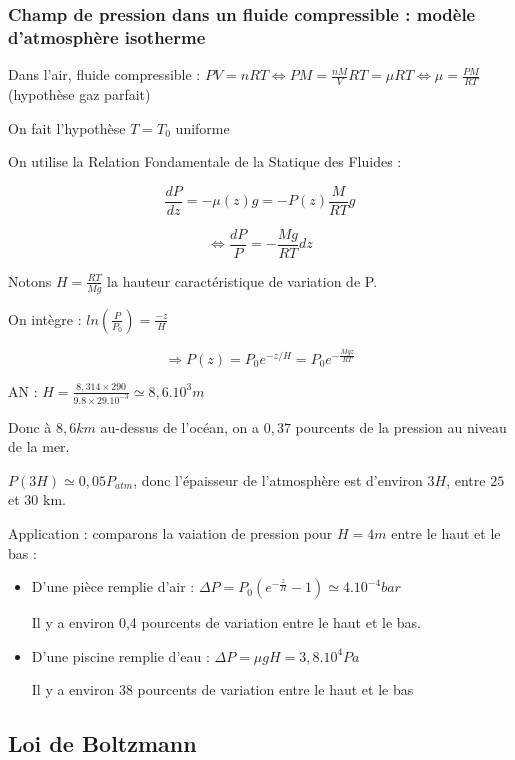 \documentclass[a4paper,12pt]{book}
\begin{document}
\subsubsection{Champ de pression dans un fluide compressible : modèle d'atmosphère isotherme}
Dans l'air, fluide compressible : $PV=nRT \Leftrightarrow PM = \frac{nM}{V}RT=\mu RT \Leftrightarrow \mu =\frac{PM}{RT}$ (hypothèse gaz parfait)
\par On fait l'hypothèse $T=T_0$ uniforme
\par On utilise la Relation Fondamentale de la Statique des Fluides :
\par $$ \frac{dP}{dz} =-\mu(z) g=-P(z)\frac{M}{RT}g$$
\par $$ \Leftrightarrow \frac{dP}{P}=-\frac{Mg}{RT}dz$$
\par Notons $H=\frac{RT}{Mg}$ la hauteur caractéristique de variation de P.
\par On intègre : $ln\left(\frac{P}{P_0}\right)=\frac{-z}{H}$
\par $$\Rightarrow P(z) = P_0e^{-z/H}=P_0e^{-\frac{Mgz}{RT}}$$
\par AN : $H=\frac{8,314\times 290}{9.8\times  29.10^{-3}}\simeq 8,6.10^3m$
\par Donc à $8,6km$ au-dessus de l'océan, on a $0,37$ pourcents de la pression au niveau de la mer.
\par $P(3H) \simeq 0,05 P_{atm}$, donc l'épaisseur de l'atmosphère est d'environ $3H$, entre $25$ et $30$ km.
\par Application : comparons la vaiation de pression pour $H=4m$ entre le haut et le bas :\begin{itemize}
    \item D'une pièce remplie d'air : $\Delta P = P_0(e^{-\frac{z}{H}}-1)\simeq 4.10^{-4} bar$
    \par Il y a environ 0,4 pourcents de variation entre le haut et le bas. 
    \item D'une piscine remplie d'eau : $\Delta P = \mu gH = 3,8.10^4 Pa$
    \par Il y a environ 38 pourcents de variation entre le haut et le bas
\end{itemize}

\subsection{Loi de Boltzmann}
\end{document}
